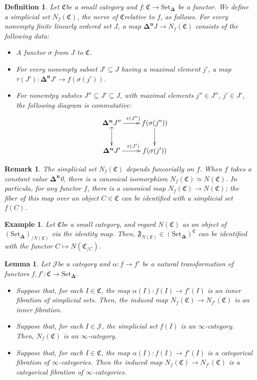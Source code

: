\documentclass[12pt]{amsart}
\newcommand{\8}{\ensuremath{\infty}}
\newcommand{\C}{\ensuremath{\mathfrak{C}}}
\newcommand{\J}{\ensuremath{\mathscr{J}}}
\newcommand{\Simplex}[1][n]{\ensuremath{\boldsymbol{\Delta^{#1}}}}
\newcommand{\SSet}{\ensuremath{\text{Set}_{\boldsymbol{\Delta}}}}
\newtheorem{definition}{Definition}
\newtheorem{lemma}{Lemma}
\newtheorem{remark}{Remark}
\newtheorem{example}{Example}
\begin{document}
\begin{definition}
  Let \C be a small category and $f : \C \rightarrow \SSet$ be a functor. We define a simplicial set $N_f(\C)$, the nerve of \C relative to $f$, as follows. For every nonempty finite linearly ordered set $J$, a map $\Simplex{J} \rightarrow N_f(\C)$ consists of the following data:
  \begin{itemize}
    \item A functor $\sigma$ from $J$ to \C.
    \item For every nonempty subset $J' \subseteq J$ having a maximal element $j'$, a map $\tau(J') : \Simplex{J'} \rightarrow f(\sigma(j'))$.
    \item For nonemtpy substes $J'' \subseteq J' \subseteq J$, with maximal elements $j'' \in J''$, $j' \in J'$, the following diagram is commutative:
          $$
            \begin{xy}
              \xymatrix{
                \Simplex{J''}\ar[r]^{\tau(J'')}\ar@{(->}[d] & f(\sigma(j''))\ar[d] \\
                \Simplex{J'}\ar[r]^{\tau(J')} & f(\sigma(j'))
              }
            \end{xy}
          $$
  \end{itemize}
\end{definition}

\begin{remark}
  The simplicial set $N_f(\C)$ depends funcorially on $f$. When $f$ takes a constant value \Simplex{0}, there is a canonical isomorphism $N_f(\C) \simeq N(\C)$. In particula, for any functor $f$, there is a canonical map $N_f(\C) \rightarrow N(\C)$; the fiber of this map over an object $C \in \C$ can be identified with a simplicial set $f(C)$.
\end{remark}

\begin{example}
  Let \C be a small category, and regard $N(\C)$ as an object of $(\SSet)_{/N(\C)}$ via the identity map. Then, $\mathfrak{F}_{N(\C)} \in (\SSet)^\C$ can be identified with the functor $C \mapsto N(\C_{/C})$.
\end{example}

\begin{lemma}
  Let \J be a category and $\alpha : f \rightarrow f'$ be a natural transformation of functors $f, f' : \C \rightarrow \SSet$.
  \begin{itemize}
    \item Suppose that, for each $I \in \C$, the map $\alpha(I) : f(I) \rightarrow f'(I)$ is an inner fibration of simplicial sets. Then, the induced map $N_f(\C) \rightarrow N_{f'}(\C)$ is an inner fibration.
    \item Suppose that, for each $I \in \J$, the simplicial set $f(I)$ is an \8-category. Then, $N_f(\C)$ is an \8-category.
    \item Suppose that, for each $I \in \C$, the map $\alpha(I) : f(I) \rightarrow f'(I)$ is a categorical fibration of \8-categories. Then the induced map $N_f(\C) \rightarrow N_{f'}(\C)$ is a categorical fibration of \8-categories.~
  \end{itemize}
\end{lemma}
\end{document}
